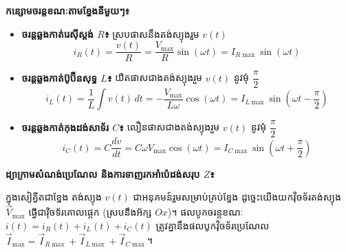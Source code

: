 \vspace{0.4em}
\noindent
\textbf{កន្សោមចរន្តខណៈតាមខ្នែងនីមួយៗ៖}
\begin{itemize}[itemsep=3pt, topsep=2pt, leftmargin=1.6em]
	\item \textbf{ចរន្តឆ្លងកាត់រេស៊ីស្តង់ $R$៖} ស្របផាសនឹងតង់ស្យុងរួម $v(t)$
	\[ i_R(t) = \dfrac{v(t)}{R} = \dfrac{V_{\max}}{R}\sin(\omega t) = I_{R\max}\sin(\omega t) \]
	\item \textbf{ចរន្តឆ្លងកាត់ប៊ូប៊ីនសុទ្ធ $L$៖} យឺតផាសជាងតង់ស្យុងរួម $v(t)$ នូវមុំ $\dfrac{\pi}{2}$
	\[ i_L(t) = \dfrac{1}{L}\int v(t)\,dt = -\dfrac{V_{\max}}{L\omega}\cos(\omega t) = I_{L\max}\sin\left(\omega t - \dfrac{\pi}{2}\right) \]
	\item \textbf{ចរន្តឆ្លងកាត់កុងដង់សាទ័រ $C$៖} លឿនផាសជាងតង់ស្យុងរួម $v(t)$ នូវមុំ $\dfrac{\pi}{2}$
	\[ i_C(t) = C\dfrac{dv}{dt} = C\omega V_{\max}\cos(\omega t) = I_{C\max}\sin\left(\omega t + \dfrac{\pi}{2}\right) \]
\end{itemize}

\pagebreak
\noindent
\textbf{ដ្យាក្រាមសំណង់ប្រេណែល និងការទាញរកអាំប៉េដង់សរុប $Z$៖}

\noindent
ក្នុងសៀគ្វីតជាខ្នែង តង់ស្យុង $v(t)$ ជាអនុគមន៍រួមសម្រាប់គ្រប់ខ្នែង ដូច្នេះយើងយកវ៉ិចទ័រតង់ស្យុង $\vec{V}_{\max}$ ធ្វើជាវ៉ិចទ័រគោលផ្ដេក (ស្របនឹងអ័ក្ស $Ox$)។ ផលបូកចរន្តខណៈ $i(t) = i_R(t) + i_L(t) + i_C(t)$ ត្រូវគ្នានឹងផលបូកវ៉ិចទ័រប្រេណែល $\vec{I}_{\max} = \vec{I}_{R\max} + \vec{I}_{L\max} + \vec{I}_{C\max}$។

